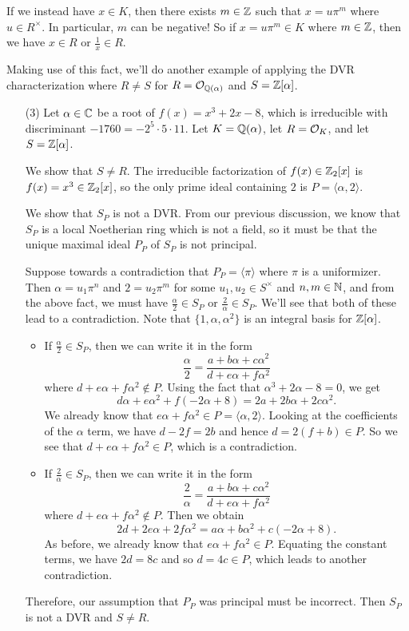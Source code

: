 If we instead have $x \in K$, then there exists $m \in \mathbb{Z}$ such that 
$x = u\pi^m$ where $u \in R^\times$. In particular, $m$ can be negative! 
So if $x = u\pi^m \in K$ where $m \in \mathbb{Z}$, then we have $x \in R$ 
or $\frac{1}{x} \in R$. 

Making use of this fact, we'll do another example of applying the DVR characterization 
where $R \neq S$ for $R = {\cal O}_{\mathbb{Q}(\alpha)}$ and $S = \mathbb{Z}[\alpha]$. 
\begin{enumerate}
    \item [(3)] Let $\alpha \in \mathbb{C}$ be a root of $f(x) = x^3 + 2x - 8$, which 
    is irreducible with discriminant $-1760 = -2^5 \cdot 5 \cdot 11$. 
    Let $K = \mathbb{Q}(\alpha)$, let $R = {\cal O}_K$, and let $S = \mathbb{Z}[\alpha]$. 

    We show that $S \neq R$. The irreducible factorization of $f(x) 
    \in \mathbb{Z}_2[x]$ is $f(x) = x^3 \in \mathbb{Z}_2[x]$, so the only prime ideal 
    containing $2$ is $P = \langle \alpha, 2 \rangle$. 

    We show that $S_P$ is not a DVR. From our previous discussion, 
    we know that $S_P$ is a local Noetherian ring which is not a field, so 
    it must be that the unique maximal ideal $P_P$ of $S_P$ is not principal.
    
    Suppose towards a contradiction that $P_P = \langle \pi \rangle$ 
    where $\pi$ is a uniformizer. Then $\alpha = u_1 \pi^n$ and 
    $2 = u_2 \pi^m$ for some $u_1, u_2 \in S^\times$ and $n, m \in \mathbb{N}$, 
    and from the above fact, we must have $\frac{\alpha}{2} \in S_P$ or 
    $\frac{2}{\alpha} \in S_P$. We'll see that both of these lead to a 
    contradiction. Note that $\{1, \alpha, \alpha^2\}$ is an integral 
    basis for $\mathbb{Z}[\alpha]$.
    \begin{itemize}
        \item If $\frac{\alpha}{2} \in S_P$, then we can write it in the form
        \[ \frac{\alpha}{2} = \frac{a + b\alpha + c\alpha^2}{d + e\alpha + f\alpha^2} \] 
        where $d + e\alpha + f\alpha^2 \notin P$. Using the fact that 
        $\alpha^3 + 2\alpha - 8 = 0$, we get 
        \[ d\alpha + e\alpha^2 + f(-2\alpha + 8) = 2a + 2b\alpha + 2c\alpha^2. \] 
        We already know that $e\alpha + f\alpha^2 \in P = \langle \alpha, 2 \rangle$. 
        Looking at the coefficients of the $\alpha$ term, we have 
        $d - 2f = 2b$ and hence $d = 2(f + b) \in P$. So we see that 
        $d + e\alpha + f\alpha^2 \in P$, which is a contradiction. 
        \item If $\frac{2}{\alpha} \in S_P$, then we can write it in the form 
        \[ \frac{2}{\alpha} = \frac{a + b\alpha + c\alpha^2}{d + e\alpha + f\alpha^2} \]
        where $d + e\alpha + f\alpha^2 \notin P$. Then we obtain 
        \[ 2d + 2e\alpha + 2f\alpha^2 = a\alpha + b\alpha^2 + c(-2\alpha + 8). \] 
        As before, we already know that $e\alpha + f\alpha^2 \in P$. 
        Equating the constant terms, we have $2d = 8c$ and so $d = 4c \in P$, 
        which leads to another contradiction. 
    \end{itemize}
    Therefore, our assumption that $P_P$ was principal must be incorrect. 
    Then $S_P$ is not a DVR and $S \neq R$.
\end{enumerate}
